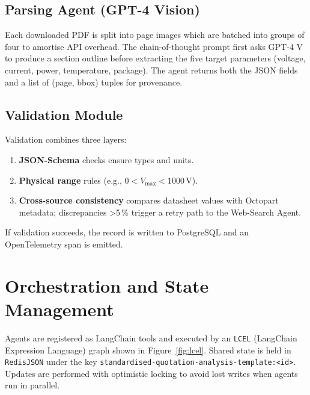 \subsection{Parsing Agent (GPT-4 Vision)}
Each downloaded PDF is split into page images which are batched into groups of four to amortise API overhead.  The chain-of-thought prompt first asks GPT-4 V to produce a section outline before extracting the five target parameters (voltage, current, power, temperature, package).  The agent returns both the JSON fields and a list of (page, bbox) tuples for provenance.

\subsection{Validation Module}
Validation combines three layers:
\begin{enumerate}
  \item \textbf{JSON-Schema} checks ensure types and units.
  \item \textbf{Physical range} rules (e.g., $0< V_{\max}<1000\,\mathrm{V}$).
  \item \textbf{Cross-source consistency} compares datasheet values with Octopart metadata; discrepancies >5\,\% trigger a retry path to the Web-Search Agent.
\end{enumerate}
If validation succeeds, the record is written to PostgreSQL and an OpenTelemetry span is emitted.

\section{Orchestration and State Management}
Agents are registered as LangChain tools and executed by an \texttt{LCEL} (LangChain Expression Language) graph shown in Figure~\ref{fig:lcel}.  Shared state is held in \texttt{RedisJSON} under the key \texttt{standardised-quotation-analysis-template:\textless{}id\textgreater{}}.  Updates are performed with optimistic locking to avoid lost writes when agents run in parallel.

